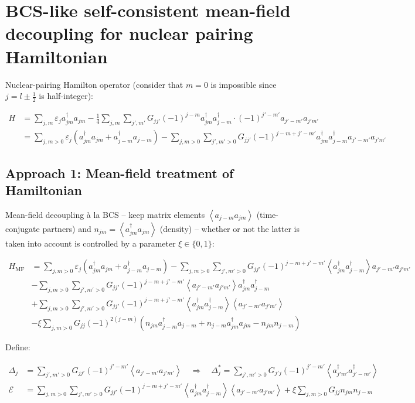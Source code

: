 \documentclass[8pt, a4paper]{article}
\newcommand{\expec}[1]{\left\langle#1\right\rangle}
\begin{document}
\section*{BCS-like self-consistent mean-field decoupling for nuclear pairing Hamiltonian}

Nuclear-pairing Hamilton operator (consider that $m=0$ is impossible since $j=l\pm \tfrac 12$ is half-integer):

\begin{align*}
H &= \sum_{j,m}\varepsilon_j a_{jm}^\dagger a_{jm} - \frac 14\sum_{j,m}\sum_{j',m'}G_{jj'}(-1)^{j-m}a_{jm}^\dagger a_{j-m}^\dagger \cdot (-1)^{j'-m'}a_{j'-m'} a_{j'm'}
\\&=
\sum_{j,m>0}\varepsilon_j \left(a_{jm}^\dagger a_{jm} + a_{j-m}^\dagger a_{j-m}\right) - \sum_{j,m>0}\sum_{j',m'>0}G_{jj'}(-1)^{j-m+j'-m'}a_{jm}^\dagger a_{j-m}^\dagger a_{j'-m'} a_{j'm'}
\end{align*}

\subsection*{Approach 1: Mean-field treatment of Hamiltonian}
Mean-field decoupling à la BCS -- keep matrix elements $\expec{a_{j-m}a_{jm}}$ (time-conjugate partners) and $n_{jm} = \expec{a_{jm}^\dagger a_{jm}}$ (density) -- whether or not the latter is taken into account is controlled by a parameter $\xi\in\{0,1\}$:

\begin{align*}
H_\mathrm{MF} &=
\sum_{j,m>0}\varepsilon_j \left(a_{jm}^\dagger a_{jm} + a_{j-m}^\dagger a_{j-m}\right)
-\sum_{j,m>0}\sum_{j',m'>0}G_{jj'}(-1)^{j-m+j'-m'}\expec{a_{jm}^\dagger a_{j-m}^\dagger} a_{j'-m'} a_{j'm'}
\\&- \sum_{j,m>0}\sum_{j',m'>0}G_{jj'}(-1)^{j-m+j'-m'}\expec{a_{j'-m'} a_{j'm'}}a_{jm}^\dagger a_{j-m}^\dagger
\\&+\sum_{j,m>0}\sum_{j',m'>0}G_{jj'}(-1)^{j-m+j'-m'}\expec{a_{jm}^\dagger a_{j-m}^\dagger}\expec{ a_{j'-m'} a_{j'm'}}
\\&-\xi\sum_{j,m>0}G_{jj}(-1)^{2(j-m)}\left(n_{jm}a_{j-m}^\dagger a_{j-m} + n_{j-m}a_{jm}^\dagger a_{jm} - n_{jm}n_{j-m}\right)
\end{align*}


Define:

\begin{align*}
\Delta_j &= \sum_{j',m'>0}G_{jj'}(-1)^{j'-m'}\expec{a_{j'-m'}a_{j'm'}}
\quad
\Rightarrow\quad \Delta_j^* = \sum_{j',m'>0}G_{j'j}(-1)^{j'-m'}\expec{a_{j'm'}^\dagger a_{j'-m'}^\dagger}
\\
\mathcal E &= \sum_{j,m>0}\sum_{j',m'>0}G_{jj'}(-1)^{j-m+j'-m'}\expec{a_{jm}^\dagger a_{j-m}^\dagger}\expec{a_{j'-m'}a_{j'm'}} + \xi\sum_{j,m>0}G_{jj}n_{jm}n_{j-m}
\end{align*}
\end{document}
